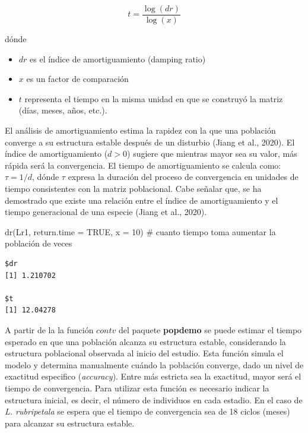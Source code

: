 \documentclass[
  12pt,
  letterpaper,
]{book}
\newenvironment{Shaded}{\begin{snugshade}}{\end{snugshade}}
\newcommand{\AttributeTok}[1]{\textcolor[rgb]{0.40,0.45,0.13}{#1}}
\newcommand{\CommentTok}[1]{\textcolor[rgb]{0.37,0.37,0.37}{#1}}
\newcommand{\ConstantTok}[1]{\textcolor[rgb]{0.56,0.35,0.01}{#1}}
\newcommand{\DecValTok}[1]{\textcolor[rgb]{0.68,0.00,0.00}{#1}}
\newcommand{\FunctionTok}[1]{\textcolor[rgb]{0.28,0.35,0.67}{#1}}
\newcommand{\NormalTok}[1]{\textcolor[rgb]{0.00,0.23,0.31}{#1}}
\providecommand{\tightlist}{%
  \setlength{\itemsep}{0pt}\setlength{\parskip}{0pt}}\usepackage{longtable,booktabs,array}
\begin{document}
\[
t = \frac{\log(dr)}{\log(x)}
\]

dónde

\begin{itemize}
\tightlist
\item
  \(dr\) es el índice de amortiguamiento (damping ratio)
\item
  \(x\) es un factor de comparación
\item
  \(t\) representa el tiempo en la misma unidad en que se construyó la
  matriz (días, meses, años, etc.).
\end{itemize}

El análisis de amortiguamiento estima la rapidez con la que una
población converge a su estructura estable después de un disturbio
(Jiang et al., 2020). El índice de amortiguamiento (\(d > 0\)) sugiere
que mientras mayor sea su valor, más rápida será la convergencia. El
tiempo de amortiguamiento se calcula como: \(\tau=1/d\), dónde \(\tau\)
expresa la duración del proceso de convergencia en unidades de tiempo
consistentes con la matriz poblacional. Cabe señalar que, se ha
demostrado que existe una relación entre el índice de amortiguamiento y
el tiempo generacional de una especie (Jiang et al., 2020).

\begin{Shaded}
\begin{Highlighting}[]
\FunctionTok{dr}\NormalTok{(Lr1, }\AttributeTok{return.time =} \ConstantTok{TRUE}\NormalTok{, }\AttributeTok{x =} \DecValTok{10}\NormalTok{) }\CommentTok{\# cuanto tiempo toma aumentar la población de veces }
\end{Highlighting}
\end{Shaded}

\begin{verbatim}
$dr
[1] 1.210702

$t
[1] 12.04278
\end{verbatim}

A partir de la la función \(contv\) del paquete \textbf{popdemo} se
puede estimar el tiempo esperado en que una población alcanza su
estructura estable, considerando la estructura poblacional observada al
inicio del estudio. Esta función simula el modelo y determina
manualmente cuándo la población converge, dado un nivel de exactitud
especifico (\emph{accuracy}). Entre más estricta sea la exactitud, mayor
será el tiempo de convergencia. Para utilizar esta función es necesario
indicar la estructura inicial, es decir, el número de individuos en cada
estadio. En el caso de \emph{L. rubripetala} se espera que el tiempo de
convergencia sea de 18 ciclos (meses) para alcanzar su estructura
estable.
\end{document}
